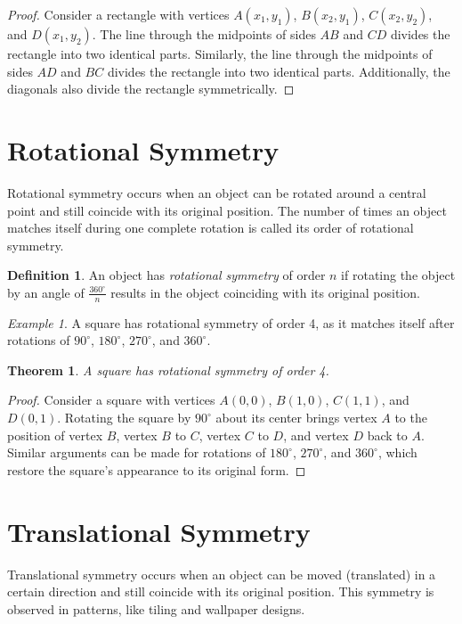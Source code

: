\documentclass{article}
\theoremstyle{plain}
\newtheorem{theorem}{Theorem}
\theoremstyle{definition}
\newtheorem{definition}{Definition}
\theoremstyle{remark}
\newtheorem{example}{Example}
\begin{document}
\begin{proof}
Consider a rectangle with vertices \(A(x_1, y_1)\), \(B(x_2, y_1)\), \(C(x_2, y_2)\), and \(D(x_1, y_2)\). The line through the midpoints of sides \(AB\) and \(CD\) divides the rectangle into two identical parts. Similarly, the line through the midpoints of sides \(AD\) and \(BC\) divides the rectangle into two identical parts. Additionally, the diagonals also divide the rectangle symmetrically.
\end{proof}

\section{Rotational Symmetry}
Rotational symmetry occurs when an object can be rotated around a central point and still coincide with its original position. The number of times an object matches itself during one complete rotation is called its order of rotational symmetry.

\begin{definition}\label{def:rotational}
An object has \textit{rotational symmetry} of order \(n\) if rotating the object by an angle of \( \frac{360^\circ}{n} \) results in the object coinciding with its original position.
\end{definition}

\begin{example}
A square has rotational symmetry of order 4, as it matches itself after rotations of \(90^\circ\), \(180^\circ\), \(270^\circ\), and \(360^\circ\).
\end{example}

\begin{theorem}\label{thm:square}
A square has rotational symmetry of order 4.
\end{theorem}

\begin{proof}
Consider a square with vertices \(A(0,0)\), \(B(1,0)\), \(C(1,1)\), and \(D(0,1)\). Rotating the square by \(90^\circ\) about its center brings vertex \(A\) to the position of vertex \(B\), vertex \(B\) to \(C\), vertex \(C\) to \(D\), and vertex \(D\) back to \(A\). Similar arguments can be made for rotations of \(180^\circ\), \(270^\circ\), and \(360^\circ\), which restore the square’s appearance to its original form.
\end{proof}

\section{Translational Symmetry}
Translational symmetry occurs when an object can be moved (translated) in a certain direction and still coincide with its original position. This symmetry is observed in patterns, like tiling and wallpaper designs.
\end{document}
